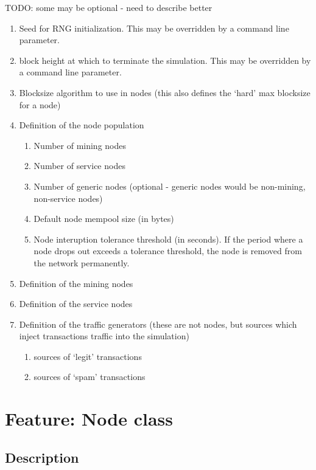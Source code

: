\documentclass{scrreprt}
\begin{document}
TODO: some may be optional - need to describe better

\begin{enumerate}
   \item Seed for RNG initialization. This may be overridden by a command line parameter.
   \item block height at which to terminate the simulation. This may be overridden by a command line parameter.
   \item Blocksize algorithm to use in nodes (this also defines the `hard' max blocksize for a node)
   \item Definition of the node population
      \begin{enumerate}
         \item Number of mining nodes
         \item Number of service nodes
         \item Number of generic nodes (optional - generic nodes would be non-mining, non-service nodes)
         \item Default node mempool size (in bytes)
         \item Node interuption tolerance threshold (in seconds). If the period where a node drops out exceeds a tolerance threshold, the node is removed from the network permanently.
      \end{enumerate}
   \item Definition of the mining nodes
   \item Definition of the service nodes
   \item Definition of the traffic generators (these are not nodes, but sources which inject transactions traffic into the simulation)
      \begin{enumerate}
         \item sources of `legit' transactions
         \item sources of `spam' transactions
      \end{enumerate}
\end{enumerate}



\section{Feature: Node class}

\subsection{Description}
\end{document}
